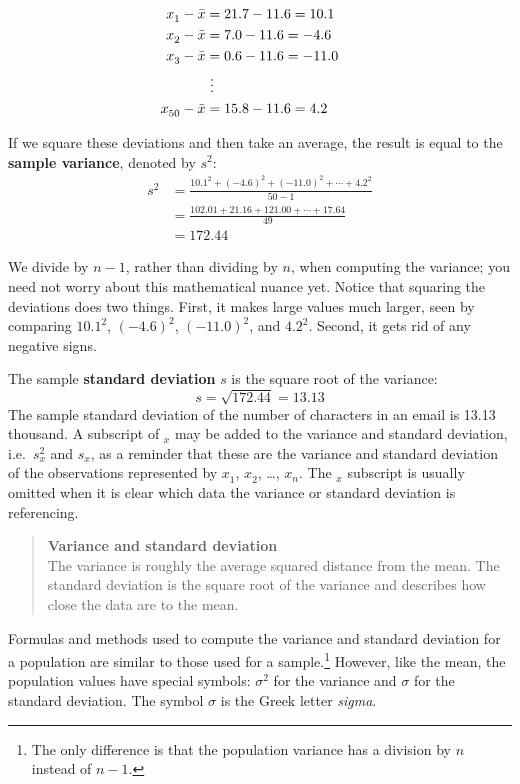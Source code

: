 \documentclass[
]{book}
\begin{document}
\[
\begin{aligned}
x_1^{}-\bar{x} &= 21.7 - 11.6 = 10.1 \hspace{5mm}\text{ } \\
x_2^{}-\bar{x} &= 7.0 - 11.6 = -4.6 \\
x_3^{}-\bar{x} &= 0.6 - 11.6 = -11.0 \\
            &\ \vdots \\
x_{50}^{}-\bar{x} &= 15.8 - 11.6 = 4.2
\end{aligned}
\]

If we square these deviations and then take an average, the result is equal to the \textbf{sample variance}, denoted by \(s_{}^2\):
\[
\begin{aligned}
s_{}^2 &= \frac{10.1_{}^2 + (-4.6)_{}^2 + (-11.0)_{}^2 + \cdots + 4.2_{}^2}{50-1} \\
    &= \frac{102.01 + 21.16 + 121.00 + \cdots + 17.64}{49} \\
    &= 172.44
\end{aligned}
\]

We divide by \(n-1\), rather than dividing by \(n\), when computing the variance; you need not worry about this mathematical nuance yet. Notice that squaring the deviations does two things. First, it makes large values much larger, seen by comparing \(10.1^2\), \((-4.6)^2\), \((-11.0)^2\), and \(4.2^2\). Second, it gets rid of any negative signs.

The sample \textbf{standard deviation} \(s\) is the square root of the variance:
\[s=\sqrt{172.44} = 13.13\]
The sample standard deviation of the number of characters in an email is 13.13 thousand. A subscript of \(_x\) may be added to the variance and standard deviation, i.e.~\(s_x^2\) and \(s_x^{}\), as a reminder that these are the variance and standard deviation of the observations represented by \(x_1^{}\), \(x_2^{}\), \ldots, \(x_n^{}\). The \(_{x}\) subscript is usually omitted when it is clear which data the variance or standard deviation is referencing.

\begin{quote}
\textbf{Variance and standard deviation}\\
The variance is roughly the average squared distance from the mean. The standard deviation is the square root of the variance and describes how close the data are to the mean.
\end{quote}

Formulas and methods used to compute the variance and standard deviation for a population are similar to those used for a sample.\footnote{The only difference is that the population variance has a division by \(n\) instead of \(n-1\).} However, like the mean, the population values have special symbols: \(\sigma_{}^2\) for the variance and \(\sigma\) for the standard deviation. The symbol \(\sigma\) is the Greek letter \emph{sigma}.
\end{document}
